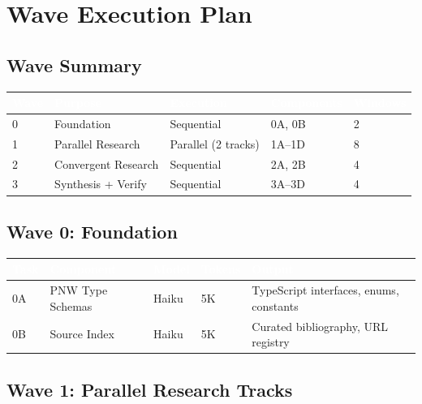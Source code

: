 \documentclass[11pt,letterpaper]{article}
\newcommand{\tableheader}[1]{\textbf{\sffamily\textcolor{white}{#1}}}
\begin{document}
\section{Wave Execution Plan}

\subsection{Wave Summary}

\begin{center}
\begin{tabularx}{\textwidth}{C{1.5cm}L{3cm}C{2cm}C{2cm}C{1.5cm}}
\toprule
{}
\tableheader{Wave} & \tableheader{Purpose} & \tableheader{Execution} & \tableheader{Components} & \tableheader{Windows} \\
 & Foundation & Sequential & 0A, 0B & 2 \\
1 & Parallel Research & Parallel (2 tracks) & 1A--1D & 8 \\
2 & Convergent Research & Sequential & 2A, 2B & 4 \\
3 & Synthesis + Verify & Sequential & 3A--3D & 4 \\
\bottomrule
\end{tabularx}
\end{center}

\subsection{Wave 0: Foundation}

\begin{center}
\begin{tabularx}{\textwidth}{C{0.8cm}L{3cm}C{1.5cm}C{1.5cm}X}
\toprule
{}
\tableheader{Task} & \tableheader{Component} & \tableheader{Model} & \tableheader{Tokens} & \tableheader{Output} \\
\midrule
0A & PNW Type Schemas & Haiku & 5K & TypeScript interfaces, enums, constants \\
0B & Source Index & Haiku & 5K & Curated bibliography, URL registry \\
\bottomrule
\end{tabularx}
\end{center}

\subsection{Wave 1: Parallel Research Tracks}
\end{document}
